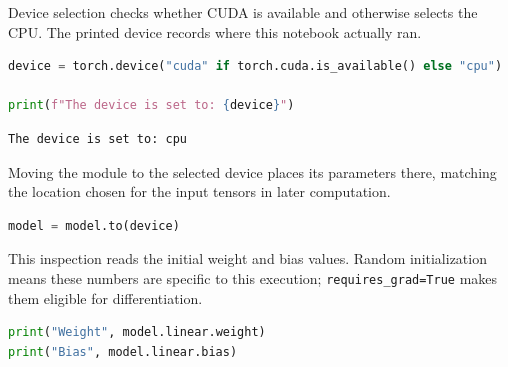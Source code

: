 \documentclass[../labs.tex]{subfiles}
\begin{document}
\label{res:lab01_cell_012}



\noindent Device selection checks whether CUDA is available and otherwise selects the CPU. The printed device records where this notebook actually ran.\par
\begin{lstlisting}[language=Python,basicstyle=\ttfamily\scriptsize,breaklines=true,breakatwhitespace=false,columns=fullflexible,keepspaces=true,numbers=none]
device = torch.device("cuda" if torch.cuda.is_available() else "cpu")

print(f"The device is set to: {device}")
\end{lstlisting}

\label{res:lab01_cell_014}

\begin{lstlisting}[style=terminalOutput]
The device is set to: cpu
\end{lstlisting}


\noindent Moving the module to the selected device places its parameters there, matching the location chosen for the input tensors in later computation.\par
\begin{lstlisting}[language=Python,basicstyle=\ttfamily\scriptsize,breaklines=true,breakatwhitespace=false,columns=fullflexible,keepspaces=true,numbers=none]
model = model.to(device)
\end{lstlisting}

\label{res:lab01_cell_016}



\noindent This inspection reads the initial weight and bias values. Random initialization means these numbers are specific to this execution; \texttt{requires\_grad=True} makes them eligible for differentiation.\par
\begin{lstlisting}[language=Python,basicstyle=\ttfamily\scriptsize,breaklines=true,breakatwhitespace=false,columns=fullflexible,keepspaces=true,numbers=none]
print("Weight", model.linear.weight)
print("Bias", model.linear.bias)
\end{lstlisting}
\end{document}
